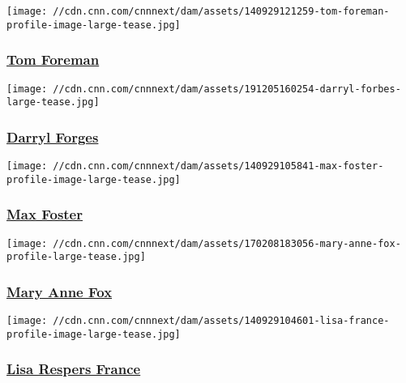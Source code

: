 \href{/profiles/tom-foreman-profile}{}

\texttt{[image: //cdn.cnn.com/cnnnext/dam/assets/140929121259-tom-foreman-profile-image-large-tease.jpg]}

\hypertarget{tom-foreman}{%
\subsubsection{\texorpdfstring{\href{/profiles/tom-foreman-profile}{Tom
Foreman}}{Tom Foreman}}\label{tom-foreman}}

\href{/profiles/darryl-forges}{}

\texttt{[image: //cdn.cnn.com/cnnnext/dam/assets/191205160254-darryl-forbes-large-tease.jpg]}

\hypertarget{darryl-forges}{%
\subsubsection{\texorpdfstring{\href{/profiles/darryl-forges}{Darryl
Forges}}{Darryl Forges}}\label{darryl-forges}}

\href{/profiles/max-foster}{}

\texttt{[image: //cdn.cnn.com/cnnnext/dam/assets/140929105841-max-foster-profile-image-large-tease.jpg]}

\hypertarget{max-foster}{%
\subsubsection{\texorpdfstring{\href{/profiles/max-foster}{Max
Foster}}{Max Foster}}\label{max-foster}}

\href{/profiles/mary-anne-fox-profile}{}

\texttt{[image: //cdn.cnn.com/cnnnext/dam/assets/170208183056-mary-anne-fox-profile-large-tease.jpg]}

\hypertarget{mary-anne-fox}{%
\subsubsection{\texorpdfstring{\href{/profiles/mary-anne-fox-profile}{Mary
Anne Fox}}{Mary Anne Fox}}\label{mary-anne-fox}}

\href{/profiles/lisa-france}{}

\texttt{[image: //cdn.cnn.com/cnnnext/dam/assets/140929104601-lisa-france-profile-image-large-tease.jpg]}

\hypertarget{lisa-respers-france}{%
\subsubsection{\texorpdfstring{\href{/profiles/lisa-france}{Lisa Respers
France}}{Lisa Respers France}}\label{lisa-respers-france}}

